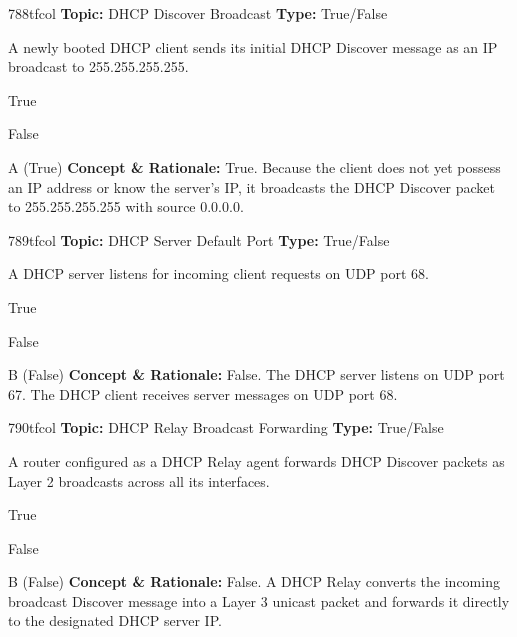 \begin{qcard}{788}{tfcol}
\textcolor{darkslate!75}{\small\textbf{Topic:} DHCP Discover Broadcast \hfill \textbf{Type:} True/False}\vspace{0.4em}\par
A newly booted DHCP client sends its initial DHCP Discover message as an IP broadcast to 255.255.255.255.
\begin{qoptions}
\item True
\item False
\end{qoptions}
\end{qcard}
\nopagebreak
\begin{explainbox}{A (True)}
\textbf{Concept \& Rationale:} True. Because the client does not yet possess an IP address or know the server's IP, it broadcasts the DHCP Discover packet to 255.255.255.255 with source 0.0.0.0.
\end{explainbox}

\begin{qcard}{789}{tfcol}
\textcolor{darkslate!75}{\small\textbf{Topic:} DHCP Server Default Port \hfill \textbf{Type:} True/False}\vspace{0.4em}\par
A DHCP server listens for incoming client requests on UDP port 68.
\begin{qoptions}
\item True
\item False
\end{qoptions}
\end{qcard}
\nopagebreak
\begin{explainbox}{B (False)}
\textbf{Concept \& Rationale:} False. The DHCP server listens on UDP port 67. The DHCP client receives server messages on UDP port 68.
\end{explainbox}

\begin{qcard}{790}{tfcol}
\textcolor{darkslate!75}{\small\textbf{Topic:} DHCP Relay Broadcast Forwarding \hfill \textbf{Type:} True/False}\vspace{0.4em}\par
A router configured as a DHCP Relay agent forwards DHCP Discover packets as Layer 2 broadcasts across all its interfaces.
\begin{qoptions}
\item True
\item False
\end{qoptions}
\end{qcard}
\nopagebreak
\begin{explainbox}{B (False)}
\textbf{Concept \& Rationale:} False. A DHCP Relay converts the incoming broadcast Discover message into a Layer 3 unicast packet and forwards it directly to the designated DHCP server IP.
\end{explainbox}

